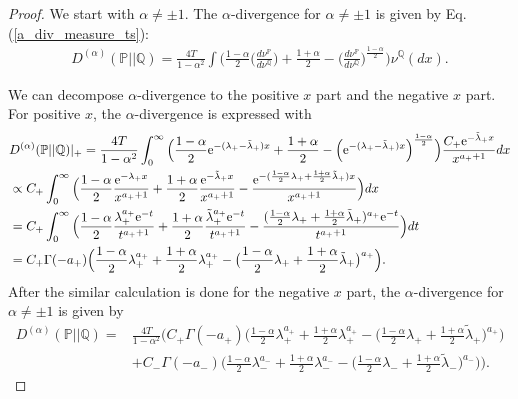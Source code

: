 \documentclass[preprint,11pt]{amsart}
\begin{document}
	\begin{proof}
	We start with $\alpha \neq \pm 1$. The $\alpha$-divergence for $\alpha \neq \pm 1$ is given by Eq. (\ref{a_div_measure_ts}):
	\begin{align}
		D^{(\alpha)}(\mathbb{P}||\mathbb{Q})=\frac{4T}{1-\alpha ^{2}}\int \Big(\frac{1-\alpha}{2}\Big(\frac{d\nu^\mathbb{P}}{d\nu^\mathbb{Q}}\Big) +\frac{1+\alpha}{2}-\Big(\frac{d\nu^\mathbb{P}}{d\nu^\mathbb{Q}}\Big)^{\frac{1-\alpha}{2}}\Big) \nu^\mathbb{Q}(dx).\nonumber
	\end{align}
	
	We can decompose $\alpha$-divergence to the positive $x$ part and the negative $x$ part. For positive $x$, the $\alpha$-divergence is expressed with
	\begin{align}
		&D^{(\alpha)}(\mathbb{P}||\mathbb{Q})|_{+}=\frac{4T}{1-\alpha ^{2}}\int_0^\infty \Big(\frac{1-\alpha}{2}{\rm e}^{-(\lambda_+-\tilde{\lambda}_+)x} +\frac{1+\alpha}{2}- \Big({\rm e}^{-(\lambda_+-\tilde{\lambda}_+)x}\Big)^{\frac{1-\alpha}{2}}\Big)\frac{C_+{\rm e}^{-\tilde{\lambda}_+ x}}{x^{a_++1}} dx\nonumber\\
	&\propto C_+\int_0^\infty \Big(\frac{1-\alpha}{2}\frac{{\rm e}^{-\lambda_+ x}}{x^{a_++1}} +\frac{1+\alpha}{2}\frac{{\rm e}^{-\tilde{\lambda}_+ x}}{x^{a_++1}} -\frac{{\rm e}^{-(\frac{1-\alpha}{2}\lambda_++\frac{1+\alpha}{2}\tilde{\lambda}_+) x}}{x^{a_++1}} \Big)dx\nonumber\\
	&=C_+\int_0^\infty \Big(\frac{1-\alpha}{2}\frac{\lambda_+^{a_+}{\rm e}^{-t}}{t^{a_++1}} +\frac{1+\alpha}{2}\frac{\tilde{\lambda}_+^{a_+}{\rm e}^{-t}}{t^{a_++1}} -\frac{(\frac{1-\alpha}{2}\lambda_++\frac{1+\alpha}{2}\tilde{\lambda}_+)^{a_+}{\rm e}^{-t}}{t^{a_++1}} \Big)dt\nonumber\\
	&=C_+\Gamma(-a_+)\Big(\frac{1-\alpha}{2}\lambda_+^{a_+}+\frac{1+\alpha}{2}\lambda_+^{a_+}-\big(\frac{1-\alpha}{2}\lambda_++\frac{1+\alpha}{2}\tilde{\lambda}_+\big)^{a_+}\Big).\nonumber
	\end{align}
	After the similar calculation is done for the negative $x$ part, the $\alpha$-divergence for $\alpha \neq \pm 1$ is given by
	\begin{align}
	D^{(\alpha)}(\mathbb{P}||\mathbb{Q})=&\frac{4T}{1-\alpha ^{2}}\bigg(C_+\Gamma(-a_+)\Big(\frac{1-\alpha}{2}\lambda_+^{a_+}+\frac{1+\alpha}{2}\lambda_+^{a_+}-\big(\frac{1-\alpha}{2}\lambda_++\frac{1+\alpha}{2}\tilde{\lambda}_+\big)^{a_+}\Big)\nonumber\\
	&+C_-\Gamma(-a_-)\Big(\frac{1-\alpha}{2}\lambda_-^{a_-}+\frac{1+\alpha}{2}\lambda_-^{a_-}-\big(\frac{1-\alpha}{2}\lambda_-+\frac{1+\alpha}{2}\tilde{\lambda}_-\big)^{a_-}\Big)\bigg).\nonumber
	\end{align}
	

\end{proof}
\end{document}
